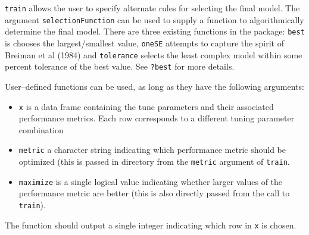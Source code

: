 \documentclass[12pt]{article}
\begin{document}
\texttt{train} allows the user to specify alternate rules for selecting the final model. The argument \texttt{selectionFunction}  can be used to supply a function to algorithmically determine the final model. There are three existing functions in the package: \texttt{best} is chooses the largest/smallest value, \texttt{oneSE} attempts to capture the spirit of Breiman et al (1984) and \texttt{tolerance} selects the least complex model within some percent tolerance of the best value. See \texttt{?best} for more details.

User--defined functions can be used, as long as they have the following arguments:
\begin{itemize}
  \item \texttt{x} is a data frame containing the tune parameters and their associated performance metrics. Each row corresponds to a different tuning parameter combination
    \item \texttt{metric} a character string indicating which performance metric should be optimized (this is passed in directory from the \texttt{metric} argument of \texttt{train}. 
      \item \texttt{maximize} is a single logical value indicating whether larger values of the performance metric are better (this is also directly passed from the call to \texttt{train}).
  \end{itemize}
  The function should output a single integer indicating which row in \texttt{x} is chosen.
\end{document}
